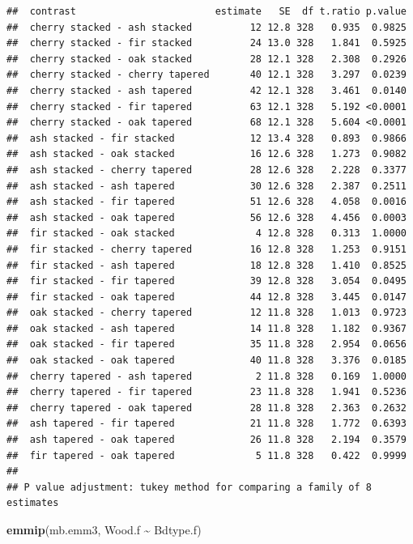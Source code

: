 \documentclass[
]{book}
\newenvironment{Shaded}{\begin{snugshade}}{\end{snugshade}}
\newcommand{\FunctionTok}[1]{\textcolor[rgb]{0.13,0.29,0.53}{\textbf{#1}}}
\newcommand{\NormalTok}[1]{#1}
\newcommand{\SpecialCharTok}[1]{\textcolor[rgb]{0.81,0.36,0.00}{\textbf{#1}}}
\begin{document}
\begin{verbatim}
##  contrast                        estimate   SE  df t.ratio p.value
##  cherry stacked - ash stacked          12 12.8 328   0.935  0.9825
##  cherry stacked - fir stacked          24 13.0 328   1.841  0.5925
##  cherry stacked - oak stacked          28 12.1 328   2.308  0.2926
##  cherry stacked - cherry tapered       40 12.1 328   3.297  0.0239
##  cherry stacked - ash tapered          42 12.1 328   3.461  0.0140
##  cherry stacked - fir tapered          63 12.1 328   5.192 <0.0001
##  cherry stacked - oak tapered          68 12.1 328   5.604 <0.0001
##  ash stacked - fir stacked             12 13.4 328   0.893  0.9866
##  ash stacked - oak stacked             16 12.6 328   1.273  0.9082
##  ash stacked - cherry tapered          28 12.6 328   2.228  0.3377
##  ash stacked - ash tapered             30 12.6 328   2.387  0.2511
##  ash stacked - fir tapered             51 12.6 328   4.058  0.0016
##  ash stacked - oak tapered             56 12.6 328   4.456  0.0003
##  fir stacked - oak stacked              4 12.8 328   0.313  1.0000
##  fir stacked - cherry tapered          16 12.8 328   1.253  0.9151
##  fir stacked - ash tapered             18 12.8 328   1.410  0.8525
##  fir stacked - fir tapered             39 12.8 328   3.054  0.0495
##  fir stacked - oak tapered             44 12.8 328   3.445  0.0147
##  oak stacked - cherry tapered          12 11.8 328   1.013  0.9723
##  oak stacked - ash tapered             14 11.8 328   1.182  0.9367
##  oak stacked - fir tapered             35 11.8 328   2.954  0.0656
##  oak stacked - oak tapered             40 11.8 328   3.376  0.0185
##  cherry tapered - ash tapered           2 11.8 328   0.169  1.0000
##  cherry tapered - fir tapered          23 11.8 328   1.941  0.5236
##  cherry tapered - oak tapered          28 11.8 328   2.363  0.2632
##  ash tapered - fir tapered             21 11.8 328   1.772  0.6393
##  ash tapered - oak tapered             26 11.8 328   2.194  0.3579
##  fir tapered - oak tapered              5 11.8 328   0.422  0.9999
## 
## P value adjustment: tukey method for comparing a family of 8 estimates
\end{verbatim}

\begin{Shaded}
\begin{Highlighting}[]
\FunctionTok{emmip}\NormalTok{(mb.emm3, Wood.f }\SpecialCharTok{\textasciitilde{}}\NormalTok{ Bdtype.f)}
\end{Highlighting}
\end{Shaded}
\end{document}
